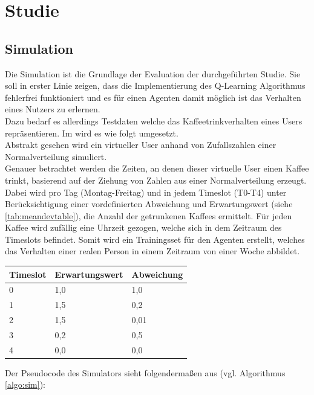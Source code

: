 \chapter{Studie}
\label{kap:Kapitel04}

\section{Simulation}
Die Simulation ist die Grundlage der Evaluation der durchgeführten Studie. Sie soll in erster Linie zeigen, dass die Implementierung des Q-Learning Algorithmus fehlerfrei funktioniert und es für einen Agenten damit möglich ist das Verhalten eines Nutzers zu erlernen. \\
Dazu bedarf es allerdings Testdaten welche das Kaffeetrinkverhalten eines Users repräsentieren. Im  wird es wie folgt umgesetzt.\\
Abstrakt gesehen wird ein virtueller User anhand von Zufallszahlen einer Normalverteilung simuliert.\\
Genauer betrachtet werden die Zeiten, an denen dieser virtuelle User einen Kaffee trinkt, basierend auf der Ziehung von Zahlen aus einer Normalverteilung erzeugt.\\ Dabei wird pro Tag (Montag-Freitag) und in jedem Timeslot (T0-T4) unter Berücksichtigung einer vordefinierten Abweichung und Erwartungswert (siehe \ref{tab:meandevtable}), die Anzahl der getrunkenen Kaffees ermittelt. Für jeden Kaffee wird zufällig eine Uhrzeit gezogen, welche sich in dem Zeitraum des Timeslots befindet. Somit wird ein Trainingsset für den Agenten erstellt, welches das Verhalten einer realen Person in einem Zeitraum von einer Woche abbildet.

\begin{center}
    \label{tab:meandevtable}
    \begin{tabular}{| l | l | l |}
    \hline
    Timeslot & Erwartungswert & Abweichung \\ \hline
    0 & 1,0 & 1,0 \\ \hline
    1 & 1,5 & 0,2 \\ \hline
    2 & 1,5 & 0,01 \\ \hline
    3 & 0,2 & 0,5 \\ \hline
    4 & 0,0 & 0,0 \\ \hline
    \end{tabular}
\end{center}


Der Pseudocode des Simulators sieht folgendermaßen aus (vgl. Algorithmus \ref{algo:sim}):

